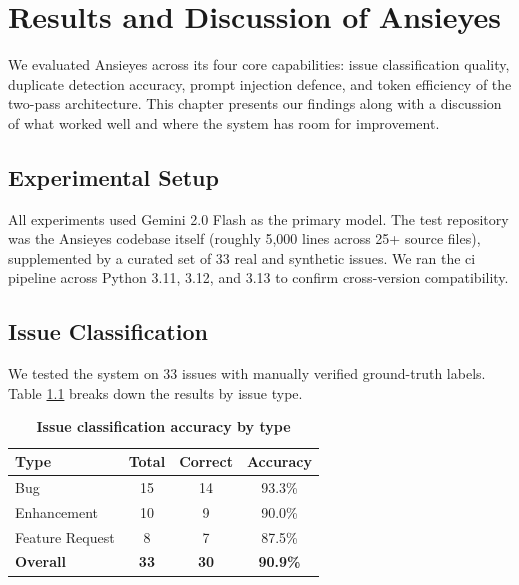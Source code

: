 \chapter{Results and Discussion of Ansieyes}

We evaluated Ansieyes across its four core capabilities: issue classification quality, duplicate detection accuracy, prompt injection defence, and token efficiency of the two-pass architecture. This chapter presents our findings along with a discussion of what worked well and where the system has room for improvement.

\section{Experimental Setup}

All experiments used Gemini 2.0 Flash as the primary model. The test repository was the Ansieyes codebase itself (roughly 5,000 lines across 25+ source files), supplemented by a curated set of 33 real and synthetic issues. We ran the \gls{ci} pipeline across Python 3.11, 3.12, and 3.13 to confirm cross-version compatibility.

\section{Issue Classification}

We tested the system on 33 issues with manually verified ground-truth labels. Table \ref{tab:classification} breaks down the results by issue type.

\begin{table}[htb]
\centering
\renewcommand{\arraystretch}{1.3}
\setlength{\arrayrulewidth}{0.5mm}
\fontsize{10}{12}\selectfont
\caption[Issue classification accuracy by type]{\textbf{Issue classification accuracy by type}}
\vspace{2mm}
\label{tab:classification}
\begin{tabular}{|p{3.5cm}|c|c|c|}
\hline
\textbf{Type} & \textbf{Total} & \textbf{Correct} & \textbf{Accuracy} \\
\hline
Bug & 15 & 14 & 93.3\% \\
\hline
Enhancement & 10 & 9 & 90.0\% \\
\hline
Feature Request & 8 & 7 & 87.5\% \\
\hline
\textbf{Overall} & \textbf{33} & \textbf{30} & \textbf{90.9\%} \\
\hline
\end{tabular}
\end{table}

